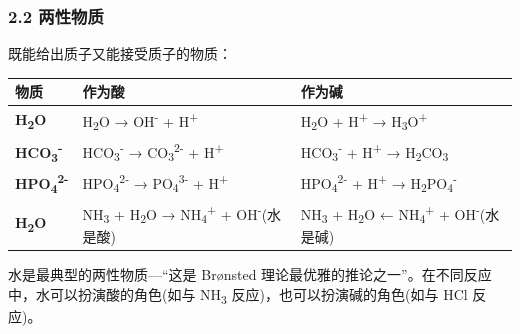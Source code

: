 \subsubsection{2.2 两性物质}\label{ux4e24ux6027ux7269ux8d28}

既能给出质子又能接受质子的物质：

{\def\LTcaptype{none} %
\begin{longtable}[]{@{}
  >{\raggedright\arraybackslash}p{}
  >{\raggedright\arraybackslash}p{}
  >{\raggedright\arraybackslash}p{}@{}}
\toprule\noalign{}
\begin{minipage}[b]{\linewidth}\raggedright
物质
\end{minipage} & \begin{minipage}[b]{\linewidth}\raggedright
作为酸
\end{minipage} & \begin{minipage}[b]{\linewidth}\raggedright
作为碱
\end{minipage} \\
\midrule\noalign{}
\endhead
\bottomrule\noalign{}
\endlastfoot
\textbf{H\textsubscript{2}O} & H\textsubscript{2}O → OH\textsuperscript{-} + H\textsuperscript{+} & H\textsubscript{2}O + H\textsuperscript{+} → H\textsubscript{3}O\textsuperscript{+} \\
\textbf{HCO\textsubscript{3}\textsuperscript{-}} & HCO\textsubscript{3}\textsuperscript{-} → CO\textsubscript{3}\textsuperscript{2-} + H\textsuperscript{+} & HCO\textsubscript{3}\textsuperscript{-} + H\textsuperscript{+} → H\textsubscript{2}CO\textsubscript{3} \\
\textbf{HPO\textsubscript{4}\textsuperscript{2-}} & HPO\textsubscript{4}\textsuperscript{2-} → PO\textsubscript{4}\textsuperscript{3-} + H\textsuperscript{+} & HPO\textsubscript{4}\textsuperscript{2-} + H\textsuperscript{+} → H\textsubscript{2}PO\textsubscript{4}\textsuperscript{-} \\
\textbf{H\textsubscript{2}O} & NH\textsubscript{3} + H\textsubscript{2}O → NH\textsubscript{4}\textsuperscript{+} + OH\textsuperscript{-}(水是酸) & NH\textsubscript{3} + H\textsubscript{2}O ← NH\textsubscript{4}\textsuperscript{+} + OH\textsuperscript{-}(水是碱) \\
\end{longtable}
}

水是最典型的两性物质---``这是 Brønsted 理论最优雅的推论之一''。在不同反应中，水可以扮演酸的角色(如与 NH\textsubscript{3} 反应)，也可以扮演碱的角色(如与 HCl 反应)。

